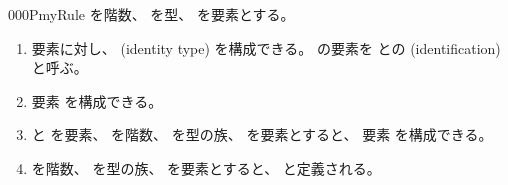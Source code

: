 \documentclass[index]{subfiles}
\begin{document}
\begin{myBlock}{000P}{myRule}
  を階数、
  を型、
  を要素とする。
  \begin{enumerate}
  \item 要素に対し、
    (identity type)
    を構成できる。
    の要素を
    との
    (identification)と呼ぶ。
  \item 要素
    を構成できる。
  \item {}と
    を要素、
    を階数、
    を型の族、
    を要素とすると、
    要素
    を構成できる。
  \item {}を階数、
    を型の族、
    を要素とすると、
    と定義される。
  \end{enumerate}
\end{myBlock}
\end{document}
